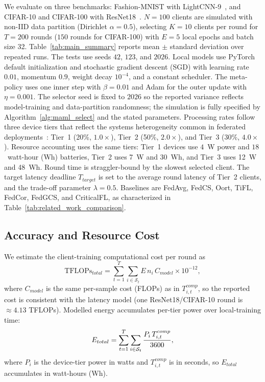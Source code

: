 \documentclass[journal]{IEEEtran}
\newcommand{\revision}[1]{#1}
\begin{document}
\revision{We evaluate on three benchmarks: Fashion-MNIST with LightCNN-9~\cite{wu2018light}, and CIFAR-10 and CIFAR-100 with ResNet18~\cite{he2016deep}.} \revision{$N = 100$ clients are simulated with non-IID data partition (Dirichlet $\alpha = 0.5$), selecting $K = 10$ clients per round for $T = 200$ rounds (\revision{$150$ rounds for CIFAR-100}) with $E = 5$ local epochs and batch size 32.} \revision{Table~\ref{tab:main_summary} reports mean $\pm$ standard deviation over repeated runs. The tests use seeds $42$, $123$, and $2026$.} \revision{Local models use PyTorch default initialization and stochastic gradient descent (SGD) with learning rate $0.01$, momentum $0.9$, weight decay $10^{-4}$, and a constant scheduler. The meta-policy uses one inner step with $\beta=0.01$ and Adam for the outer update with $\eta=0.001$. The selector seed is fixed to $2026$ so the reported variance reflects model-training and data-partition randomness; the simulation is fully specified by Algorithm~\ref{alg:maml_select} and the stated parameters.} \revision{Processing rates follow three device tiers that reflect the systems heterogeneity common in federated deployments~\cite{li2020federated}: Tier~1 (20\%, $1.0\times$), Tier~2 (50\%, $2.0\times$), and Tier~3 (30\%, $4.0\times$).} \revision{Resource accounting uses the same tiers: Tier~1 devices use $4$~W power and $18$~watt-hour (Wh) batteries, Tier~2 uses 7~W and 30~Wh, and Tier~3 uses 12~W and 48~Wh. Round time is straggler-bound by the slowest selected client. 
} {\color{black}The target latency deadline $T_{target}$ is set to the average round latency of Tier~2 clients, and the trade-off parameter $\lambda = 0.5$. \revision{Baselines are FedAvg, FedCS, Oort, TiFL, FedCor, FedGCS, and CriticalFL, as characterized in Table~\ref{tab:related_work_comparison}.}}

\subsection{\revision{Accuracy and Resource Cost}}
\revision{We estimate the client-training computational cost per round as}
\begin{equation}
	\text{TFLOPs}_{total} = \sum_{t=1}^{T} \sum_{i \in \mathcal{S}_t} E\, n_i\, C_{model} \times 10^{-12},
	\label{eq:tflops}
\end{equation}
\revision{where $C_{model}$ is the same per-sample cost (FLOPs) as in $T_{i,t}^{comp}$, so the reported cost is consistent with the latency model (one ResNet18/CIFAR-10 round is $\approx4.13$ TFLOPs). Modelled energy accumulates per-tier power over local-training time:}
\begin{equation}
\color{black}
E_{total}=\sum_{t=1}^{T}\sum_{i\in\mathcal{S}_t} \frac{P_i\,T_{i,t}^{comp}}{3600},
\label{eq:energy}
\end{equation}
\revision{where $P_i$ is the device-tier power in watts and $T_{i,t}^{comp}$ is in seconds, so $E_{total}$ accumulates in watt-hours (Wh).}
\end{document}
